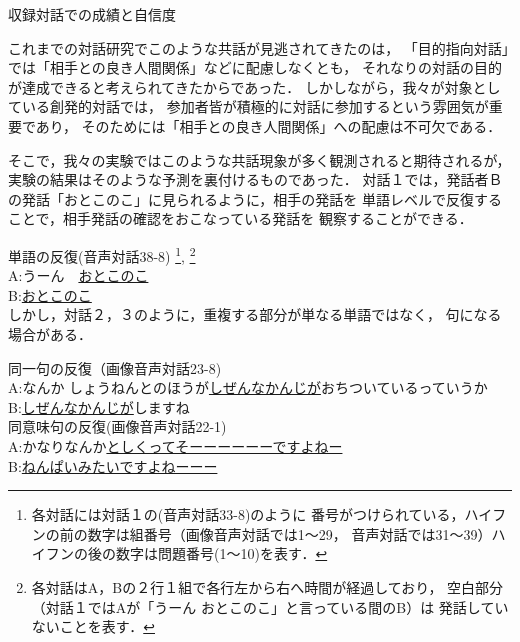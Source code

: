 \begin{table}
\caption{収録対話での成績と自信度}
\end{table}

これまでの対話研究でこのような共話が見逃されてきたのは，
「目的指向対話」では「相手との良き人間関係」などに配慮しなくとも，
それなりの対話の目的が達成できると考えられてきたからであった．
しかしながら，我々が対象としている創発的対話では，
参加者皆が積極的に対話に参加するという雰囲気が重要であり，
そのためには「相手との良き人間関係」への配慮は不可欠である．

そこで，我々の実験ではこのような共話現象が多く観測されると期待されるが，
実験の結果はそのような予測を裏付けるものであった．
対話１では，発話者Ｂの発話「おとこのこ」に見られるように，相手の発話を
単語レベルで反復することで，相手発話の確認をおこなっている発話を
観察することができる．

\hspace*{-0.5cm}{\bf 対話１}\hspace{0.33cm}単語の反復(音声対話38-8)
\footnote[1]{各対話には対話１の(音声対話33-8)のように
番号がつけられている，ハイフンの前の数字は組番号（画像音声対話では1〜29，
音声対話では31〜39）ハイフンの後の数字は問題番号(1〜10)を表す．},
\footnote[2]{各対話はA，Bの２行１組で各行左から右へ時間が経過しており，
空白部分（対話１ではAが「うーん おとこのこ」と言っている間のB）は
発話していないことを表す．}\\
A:うーん　\underline{おとこのこ}\\
B:\hspace{2.9cm}\underline{おとこのこ}\\

\hspace*{-0.5cm}しかし，対話２，３のように，重複する部分が単なる単語ではなく，
句になる場合がある．

\hspace*{-0.5cm}{\bf 対話２}\hspace{0.33cm}同一句の反復（画像音声対話23-8)\\
A:なんか しょうねんとのほうが\underline{しぜんなかんじが}おちついているっていうか\\
B:\hspace{4.6cm}\underline{しぜんなかんじが}しますね\\

\hspace*{-0.5cm}{\bf 対話３}\hspace{0.33cm}同意味句の反復(画像音声対話22-1)\\
A:かなりなんか\hspace{0.18cm}\underline{としくって\hspace{0.18cm}そーーーーーーですよねー}\\
B:\hspace{3.6cm}\underline{ねんぱいみたいですよねーーー}\\

